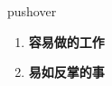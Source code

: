 
\begin{frame}
{\huge pushover}
\begin{center}
\begin{enumerate}\Large
  \item \textbf{容易做的工作}
  \item \textbf{易如反掌的事}
\end{enumerate}
\end{center}
\end{frame}
